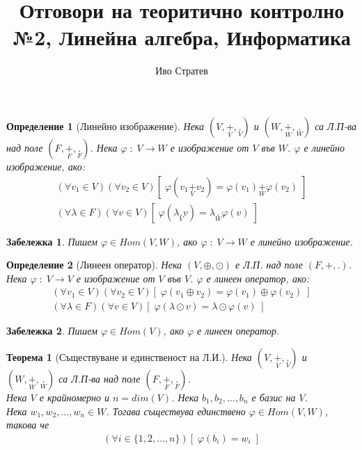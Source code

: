 \documentclass[12pt]{article}
\author{Иво Стратев}
\title{Отговори на теоритично контролно №2, Линейна алгебра, Информатика}
\newtheorem{theorem}{Теорема}%
\newtheorem{remark}{{Забележка}}%
\newtheorem{definition}{Определение}%
\begin{document}
\maketitle

\begin{definition}[Линейно изображение]
Нека \((V, \underset{V}{+}, \underset{V}{.})\) и \((W, \underset{W}{+}, \underset{W}{.})\) са Л.П-ва над поле \((F, \underset{F}{+}, \underset{F}{.})\).
Нека \(\varphi \; : \; V \to W\) е изображение от \(V\) във \(W\).
\(\varphi\) е линейно изображение, ако:
\begin{align*}
(\forall v_1 \in V)(\forall v_2 \in V)[\; \varphi(v_1 \underset{V}{+} v_2) = \varphi(v_1) \underset{W}{+} \varphi(v_2)\;] \\
(\forall \lambda \in F)(\forall v \in V)[\; \varphi(\lambda \underset{V}{.} v) = \lambda \underset{W}{.} \varphi(v)\;] 
\end{align*}
\end{definition}

\begin{remark}
Пишем \(\varphi \in Hom(V, W)\), ако \(\varphi \; : \; V \to W\) е линейно изображение.
\end{remark}

\begin{definition}[Линеен оператор]
Нека \((V, \oplus, \odot)\) е Л.П. над поле \((F, +, .)\).
Нека \(\varphi \; : \; V \to V\) е изображение от \(V\) във \(V\).
\(\varphi\) е линеен оператор, ако:
\begin{align*}
(\forall v_1 \in V)(\forall v_2 \in V)[\; \varphi(v_1 \oplus v_2) = \varphi(v_1) \oplus \varphi(v_2)\;] \\
(\forall \lambda \in F)(\forall v \in V)[\; \varphi(\lambda \odot v) = \lambda \odot \varphi(v)\;] 
\end{align*}
\end{definition}

\begin{remark}
Пишем \(\varphi \in Hom(V)\), ако \(\varphi\) е линеен оператор.
\end{remark}

\begin{theorem}[Съществуване и единственост на Л.И.]
Нека \((V, \underset{V}{+}, \underset{V}{.})\) и \((W, \underset{W}{+}, \underset{W}{.})\) са Л.П-ва над поле \((F, \underset{F}{+}, \underset{F}{.})\).
\\Нека \(V\) е крайномерно и \(n = dim(V)\).
Нека \(b_1, b_2, \dots, b_n\) е базис на \(V\).
\\Нека \(w_1, w_2, \dots, w_n \in W\).
Тогава съществува единствено \(\varphi \in Hom(V, W)\), такова че
\begin{align*}
(\forall i \in \{1, 2, \dots, n\})[\; \varphi(b_i) = w_i\;]
\end{align*}
\end{theorem}
\end{document}
